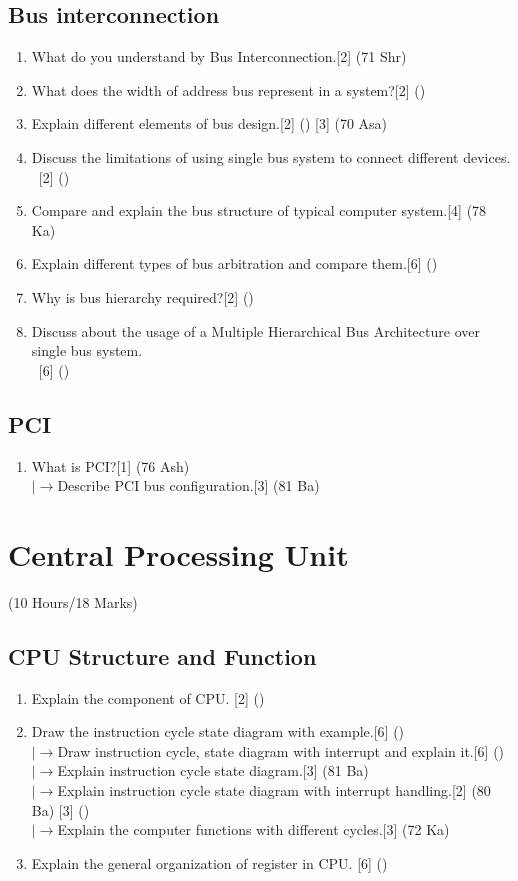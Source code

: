 \documentclass[12pt]{article}
\newcommand{\lb}{\\$\left|\rightarrow\right.$}
\newcommand{\enter}{\\\textcolor{white}{1}}
\begin{document}
	\subsection{Bus interconnection}
	\begin{enumerate}[noitemsep, topsep = 0pt]
	\item What do you understand by Bus Interconnection.\hfill[2] (71 Shr)
	\item What does the width of address bus represent in a system?\hfill[2] ()
	\item Explain different elements of bus design.\hfill[2] () [3] (70 Asa)
	\item Discuss the limitations of using single bus system to connect different devices.
	\enter\hfill[2] ()
	\item Compare and explain the bus structure of typical computer system.\hfill[4] (78 Ka)
	\item Explain different types of bus arbitration and compare them.\hfill[6] ()
	\item Why is bus hierarchy required?\hfill[2] ()
	\item Discuss about the usage of a Multiple Hierarchical Bus Architecture over single bus system.
	\enter\hfill[6] ()
	\end{enumerate}
	\subsection{PCI}
	\begin{enumerate}[noitemsep, topsep = 0pt]
	\item What is PCI?\hfill[1] (76 Ash)
	\lb Describe PCI bus configuration.\hfill[3] (81 Ba)
	\end{enumerate}

	\pagebreak
\section{Central Processing Unit}
	\begin{center}(10 Hours/18 Marks)\end{center}
	\subsection{CPU Structure and Function}
	\begin{enumerate}
		\item Explain the component of CPU. \hfill [2] ()
	\item Draw the instruction cycle state diagram with example.\hfill[6] ()
	\lb Draw instruction cycle, state diagram with interrupt and explain it.\hfill[6] ()
	\lb Explain instruction cycle state diagram.\hfill[3] (81 Ba)
	\lb Explain instruction cycle state diagram with interrupt handling.\hfill[2] (80 Ba) [3] ()
	\lb Explain the computer functions with different cycles.\hfill[3] (72 Ka)

		\item Explain the general organization of register in CPU. \hfill [6] ()
	\end{enumerate}
	
\end{document}
